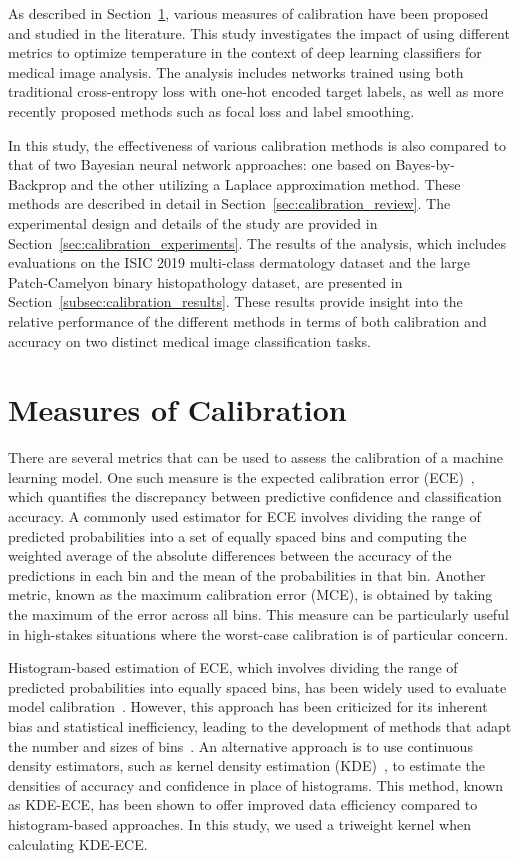 As described in Section~\ref{sec:calibration_measures}, various measures of calibration have been proposed and studied in the literature. This study investigates the impact of using different metrics to optimize temperature in the context of deep learning classifiers for medical image analysis. The analysis includes networks trained using both traditional cross-entropy loss with one-hot encoded target labels, as well as more recently proposed methods such as focal loss and label smoothing.

In this study, the effectiveness of various calibration methods is also compared to that of two Bayesian neural network approaches: one based on Bayes-by-Backprop and the other utilizing a Laplace approximation method. These methods are described in detail in Section~\ref{sec:calibration_review}. The experimental design and details of the study are provided in Section~\ref{sec:calibration_experiments}. The results of the analysis, which includes evaluations on the ISIC 2019 multi-class dermatology dataset and the large Patch-Camelyon binary histopathology dataset, are presented in Section~\ref{subsec:calibration_results}. These results provide insight into the relative performance of the different methods in terms of both calibration and accuracy on two distinct medical image classification tasks.



\section{Measures of Calibration}
\label{sec:calibration_measures}
There are several metrics that can be used to assess the calibration of a machine learning model. One such measure is the expected calibration error (ECE)~\cite{guo2017calibration}, which quantifies the discrepancy between predictive confidence and classification accuracy. A commonly used estimator for ECE involves dividing the range of predicted probabilities into a set of equally spaced bins and computing the weighted average of the absolute differences between the accuracy of the predictions in each bin and the mean of the probabilities in that bin. Another metric, known as the maximum calibration error (MCE), is obtained by taking the maximum of the error across all bins. This measure can be particularly useful in high-stakes situations where the worst-case calibration is of particular concern.

Histogram-based estimation of ECE, which involves dividing the range of predicted probabilities into equally spaced bins, has been widely used to evaluate model calibration~\cite{muller2019does}. However, this approach has been criticized for its inherent bias and statistical inefficiency, leading to the development of methods that adapt the number and sizes of bins~\cite{roelofs2022mitigating}. An alternative approach is to use continuous density estimators, such as kernel density estimation (KDE)~\cite{parzen1962estimation}, to estimate the densities of accuracy and confidence in place of histograms. This method, known as KDE-ECE, has been shown to offer improved data efficiency compared to histogram-based approaches. In this study, we used a triweight kernel when calculating KDE-ECE.

